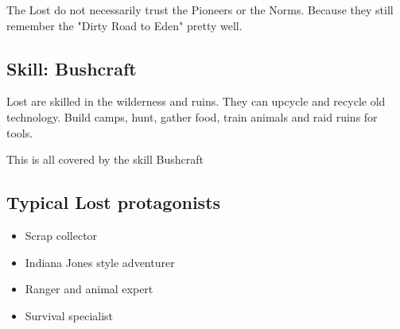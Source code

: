 The Lost do not necessarily trust the Pioneers or the Norms. Because they still remember the "Dirty Road to Eden" pretty well.

\subsection{Skill: Bushcraft}

Lost are skilled in the wilderness and ruins. They can upcycle and recycle old technology. Build camps, hunt, gather food, train animals and raid ruins for tools.

This is all covered by the skill Bushcraft

\subsection{Typical Lost protagonists}

\begin{itemize}
    \item Scrap collector
    \item Indiana Jones style adventurer
    \item Ranger and animal expert
    \item Survival specialist
\end{itemize}

